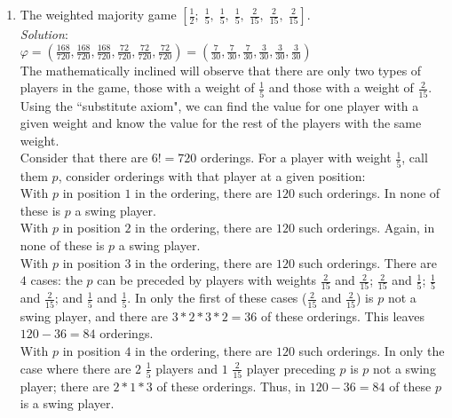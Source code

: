 \documentclass{article}
\begin{document}
\begin{enumerate}
\begin{enumerate}
  \item The weighted majority game $ [\frac{1}{2};\; \frac{1}{5},\; \frac{1}{5},\; \frac{1}{5},\; \frac{2}{15},\; \frac{2}{15},\; \frac{2}{15}] $. \\

  \textit{Solution}:\\

  $ \varphi
      = (\frac{168}{720}, \frac{168}{720}, \frac{168}{720}, \frac{72}{720}, \frac{72}{720}, \frac{72}{720})
      = (\frac{7}{30}, \frac{7}{30}, \frac{7}{30}, \frac{3}{30}, \frac{3}{30}, \frac{3}{30})$ \\

  The mathematically inclined will observe that there are only two types of players in the game, those with a weight of $\frac{1}{5}$ and those with a weight of $\frac{2}{15}$. Using the ``substitute axiom", we can find the value for one player with a given weight and know the value for the rest of the players with the same weight. \\

  Consider that there are $6! = 720$ orderings. For a player with weight $\frac{1}{5}$, call them $p$, consider orderings with that player at a given position: \\

  With $p$ in position $1$ in the ordering, there are $120$ such orderings. In none of these is $p$ a swing player. \\

  With $p$ in position $2$ in the ordering, there are $120$ such orderings. Again, in none of these is $p$ a swing player. \\
  

  With $p$ in position $3$ in the ordering, there are $120$ such orderings. There are $4$ cases: the $p$ can be preceded by players with weights $\frac{2}{15}$ and $\frac{2}{15}$; $\frac{2}{15}$ and $\frac{1}{5}$; $\frac{1}{5}$ and $\frac{2}{15}$; and $\frac{1}{5}$ and $\frac{1}{5}$. In only the first of these cases ($\frac{2}{15}$ and $\frac{2}{15}$) is $p$ not a swing player, and there are $3 * 2 * 3 * 2 = 36$ of these orderings. This leaves $120 - 36 = 84$ orderings. \\

  With $p$ in position $4$ in the ordering, there are $120$ such orderings. In only the case where there are $2$ $\frac{1}{5}$ players and $1$ $\frac{2}{15}$ player preceding $p$ is $p$ not a swing player; there are $2 * 1 * 3$ of these orderings. Thus, in  $120 - 36 = 84$ of these $p$ is a swing player. \\


\end{enumerate}
\end{enumerate}
\end{document}
